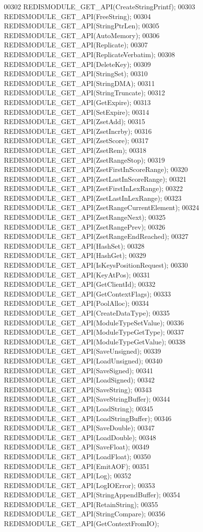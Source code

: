 \begin{DoxyCode}
00302     REDISMODULE\_GET\_API(CreateStringPrintf);
00303     REDISMODULE\_GET\_API(FreeString);
00304     REDISMODULE\_GET\_API(StringPtrLen);
00305     REDISMODULE\_GET\_API(AutoMemory);
00306     REDISMODULE\_GET\_API(Replicate);
00307     REDISMODULE\_GET\_API(ReplicateVerbatim);
00308     REDISMODULE\_GET\_API(DeleteKey);
00309     REDISMODULE\_GET\_API(StringSet);
00310     REDISMODULE\_GET\_API(StringDMA);
00311     REDISMODULE\_GET\_API(StringTruncate);
00312     REDISMODULE\_GET\_API(GetExpire);
00313     REDISMODULE\_GET\_API(SetExpire);
00314     REDISMODULE\_GET\_API(ZsetAdd);
00315     REDISMODULE\_GET\_API(ZsetIncrby);
00316     REDISMODULE\_GET\_API(ZsetScore);
00317     REDISMODULE\_GET\_API(ZsetRem);
00318     REDISMODULE\_GET\_API(ZsetRangeStop);
00319     REDISMODULE\_GET\_API(ZsetFirstInScoreRange);
00320     REDISMODULE\_GET\_API(ZsetLastInScoreRange);
00321     REDISMODULE\_GET\_API(ZsetFirstInLexRange);
00322     REDISMODULE\_GET\_API(ZsetLastInLexRange);
00323     REDISMODULE\_GET\_API(ZsetRangeCurrentElement);
00324     REDISMODULE\_GET\_API(ZsetRangeNext);
00325     REDISMODULE\_GET\_API(ZsetRangePrev);
00326     REDISMODULE\_GET\_API(ZsetRangeEndReached);
00327     REDISMODULE\_GET\_API(HashSet);
00328     REDISMODULE\_GET\_API(HashGet);
00329     REDISMODULE\_GET\_API(IsKeysPositionRequest);
00330     REDISMODULE\_GET\_API(KeyAtPos);
00331     REDISMODULE\_GET\_API(GetClientId);
00332     REDISMODULE\_GET\_API(GetContextFlags);
00333     REDISMODULE\_GET\_API(PoolAlloc);
00334     REDISMODULE\_GET\_API(CreateDataType);
00335     REDISMODULE\_GET\_API(ModuleTypeSetValue);
00336     REDISMODULE\_GET\_API(ModuleTypeGetType);
00337     REDISMODULE\_GET\_API(ModuleTypeGetValue);
00338     REDISMODULE\_GET\_API(SaveUnsigned);
00339     REDISMODULE\_GET\_API(LoadUnsigned);
00340     REDISMODULE\_GET\_API(SaveSigned);
00341     REDISMODULE\_GET\_API(LoadSigned);
00342     REDISMODULE\_GET\_API(SaveString);
00343     REDISMODULE\_GET\_API(SaveStringBuffer);
00344     REDISMODULE\_GET\_API(LoadString);
00345     REDISMODULE\_GET\_API(LoadStringBuffer);
00346     REDISMODULE\_GET\_API(SaveDouble);
00347     REDISMODULE\_GET\_API(LoadDouble);
00348     REDISMODULE\_GET\_API(SaveFloat);
00349     REDISMODULE\_GET\_API(LoadFloat);
00350     REDISMODULE\_GET\_API(EmitAOF);
00351     REDISMODULE\_GET\_API(Log);
00352     REDISMODULE\_GET\_API(LogIOError);
00353     REDISMODULE\_GET\_API(StringAppendBuffer);
00354     REDISMODULE\_GET\_API(RetainString);
00355     REDISMODULE\_GET\_API(StringCompare);
00356     REDISMODULE\_GET\_API(GetContextFromIO);

\end{DoxyCode}
